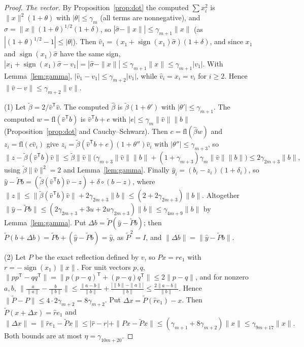 \begin{proof}
\emph{The vector.} By Proposition~\ref{prop:dot} the computed $\sum x_i^2$ is $\|x\|^2(1+\theta)$ with $|\theta|\le\gamma_m$ (all terms are
nonnegative), and $\hat\sigma=\|x\|(1+\theta)^{1/2}(1+\delta)$, so $|\hat\sigma-\|x\||\le\gamma_{m+1}\|x\|$ (as $|(1+\theta)^{1/2}-1|\le|\theta|$). Then
$\hat v_1=(x_1+\operatorname{sign}(x_1)\hat\sigma)(1+\delta)$, and since $x_1$ and $\operatorname{sign}(x_1)\hat\sigma$ have the same sign,
$|x_1+\operatorname{sign}(x_1)\hat\sigma-v_1|=|\hat\sigma-\|x\||\le\gamma_{m+1}\|x\|\le\gamma_{m+1}|v_1|$. With Lemma~\ref{lem:gamma}, $|\hat v_1-v_1|\le\gamma_{m+2}|v_1|$,
while $\hat v_i=x_i=v_i$ for $i\ge2$. Hence $\|\hat v-v\|\le\gamma_{m+2}\|v\|$.

(1) Let $\tilde\beta=2/\hat v^{\mathsf T}\hat v$. The computed $\hat\beta$ is $\tilde\beta(1+\theta')$ with $|\theta'|\le\gamma_{m+1}$. The computed
$w=\mathrm{fl}(\hat v^{\mathsf T}b)$ is $\hat v^{\mathsf T}b+e$ with $|e|\le\gamma_m\|\hat v\|\|b\|$ (Proposition~\ref{prop:dot} and Cauchy--Schwarz). Then
$c=\mathrm{fl}(\hat\beta w)$ and $z_i=\mathrm{fl}(c\hat v_i)$ give $z_i=\tilde\beta(\hat v^{\mathsf T}b+e)(1+\theta'')\hat v_i$ with $|\theta''|\le\gamma_{m+3}$, so
\[
\|z-\tilde\beta(\hat v^{\mathsf T}b)\hat v\|\le\tilde\beta\|\hat v\|\bigl(\gamma_{m+3}\|\hat v\|\|b\|+(1+\gamma_{m+3})\gamma_m\|\hat v\|\|b\|\bigr)\le2\gamma_{2m+3}\|b\|,
\]
using $\tilde\beta\|\hat v\|^2=2$ and Lemma~\ref{lem:gamma}. Finally $\hat y_i=(b_i-z_i)(1+\delta_i)$, so $\hat y-\tilde Pb=(\tilde\beta(\hat v^{\mathsf T}b)\hat v-z)+\delta\circ(b-z)$,
where $\|z\|\le\|\tilde\beta(\hat v^{\mathsf T}b)\hat v\|+2\gamma_{2m+3}\|b\|\le(2+2\gamma_{2m+3})\|b\|$. Altogether
$\|\hat y-\tilde Pb\|\le(2\gamma_{2m+3}+3u+2u\gamma_{2m+3})\|b\|\le\gamma_{4m+9}\|b\|$ by Lemma~\ref{lem:gamma}. Put $\Delta b=\tilde P(\hat y-\tilde Pb)$; then
$\tilde P(b+\Delta b)=\tilde Pb+(\hat y-\tilde Pb)=\hat y$, as $\tilde P^2=I$, and $\|\Delta b\|=\|\hat y-\tilde Pb\|$.

(2) Let $P$ be the exact reflection defined by $v$, so $Px=re_1$ with $r=-\operatorname{sign}(x_1)\|x\|$. For unit vectors $p,q$,
$\|pp^{\mathsf T}-qq^{\mathsf T}\|=\|p(p-q)^{\mathsf T}+(p-q)q^{\mathsf T}\|\le2\|p-q\|$, and for nonzero $a,b$,
$\bigl\|\frac a{\|a\|}-\frac b{\|b\|}\bigr\|\le\frac{\|a-b\|}{\|b\|}+\frac{|\|b\|-\|a\||}{\|b\|}\le\frac{2\|a-b\|}{\|b\|}$. Hence
$\|\tilde P-P\|\le4\cdot2\gamma_{m+2}=8\gamma_{m+2}$. Put $\Delta x=\tilde P(\hat re_1)-x$. Then $\tilde P(x+\Delta x)=\hat re_1$ and
\[
\|\Delta x\|=\|\hat re_1-\tilde Px\|\le|\hat r-r|+\|Px-\tilde Px\|\le(\gamma_{m+1}+8\gamma_{m+2})\|x\|\le\gamma_{9m+17}\|x\|.
\]
Both bounds are at most $\eta=\gamma_{10m+20}$.
\end{proof}

